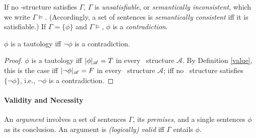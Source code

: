 If no \lone-structure satisfies $\Gamma$,  $\Gamma$ is \emph{unsatisfiable}, or \emph{semantically inconsistent}, which we write $\Gamma\vDash$. (Accordingly, a set of sentences is \emph{semantically consistent} iff it is satisfiable.) If $\Gamma = \{\phi\}$ and $\Gamma \vDash$,  $\phi$ is a \emph{contradiction}.
\begin{theorem}
	$\phi$ is a tautology iff $\neg\phi$ is a contradiction.
	\begin{proof}
		$\phi$ is a tautology iff $|\phi|_{\mathscr{A}} =T$ in every \lone\ structure $\mathscr{A}$. By Definition \ref{value}, this is the case iff $|\neg\phi|_{\mathscr{A}}=F$ in every \lone\ structure $\mathscr{A}$; iff no \lone\ structure satisfies $\{\neg\phi\}$, i.e., $\neg\phi$ is a contradiction. 
	\end{proof}
\end{theorem}


\paragraph{Validity and Necessity}An \emph{argument} involves a set of sentences $\Gamma$, its \emph{premises}, and a single sentences $\phi$ as its conclusion. An argument is \emph{(logically) valid} iff  $\Gamma$  entails $\phi$. 

